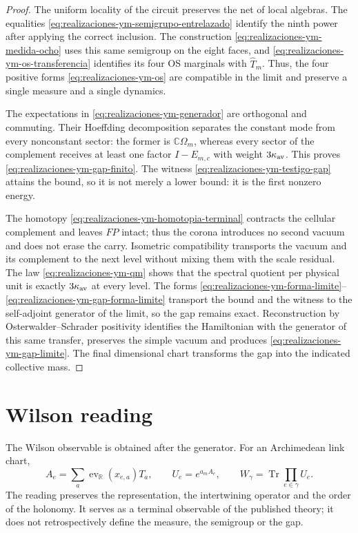 \begin{proof}
The uniform locality of the circuit preserves the net of local algebras. The
equalities \eqref{eq:realizaciones-ym-semigrupo-entrelazado} identify the
ninth power after applying the correct inclusion. The construction
\eqref{eq:realizaciones-ym-medida-ocho} uses this same semigroup on the eight
faces, and \eqref{eq:realizaciones-ym-os-transferencia} identifies its four
OS marginals with \(\widehat T_m\). Thus, the four positive forms
\eqref{eq:realizaciones-ym-os} are compatible in the limit and preserve a
single measure and a single dynamics.

The expectations in \eqref{eq:realizaciones-ym-generador} are orthogonal and
commuting. Their Hoeffding decomposition separates the constant mode from every
nonconstant sector: the former is \(\mathbb C\Omega_m\), whereas every
sector of the complement receives at least one factor \(I-E_{m,c}\) with weight
\(3\kappa_{\rm av}\). This proves
\eqref{eq:realizaciones-ym-gap-finito}. The witness
\eqref{eq:realizaciones-ym-testigo-gap} attains the bound, so it is not
merely a lower bound: it is the first nonzero energy.

The homotopy \eqref{eq:realizaciones-ym-homotopia-terminal} contracts the
cellular complement and leaves \(FP\) intact; thus the corona introduces no
second vacuum and does not erase the carry. Isometric compatibility transports the
vacuum and its complement to the next level without mixing them with the scale
residual. The law
\eqref{eq:realizaciones-ym-qm} shows that the spectral quotient per physical
unit is exactly \(3\kappa_{\rm av}\) at every level. The forms
\eqref{eq:realizaciones-ym-forma-limite}--
\eqref{eq:realizaciones-ym-gap-forma-limite} transport the bound and the witness
to the self-adjoint generator of the limit, so the gap remains exact.
Reconstruction by Osterwalder--Schrader
positivity identifies the Hamiltonian with the generator of this
same transfer, preserves the simple vacuum and produces
\eqref{eq:realizaciones-ym-gap-limite}. The final dimensional chart transforms
the gap into the indicated collective mass.
\end{proof}



\section*{Wilson reading}

The Wilson observable is obtained after the generator. For an Archimedean link
chart,
\begin{equation}\label{eq:realizaciones-ym-wilson}
 A_e=\sum_a\operatorname{ev}_{\mathbb R}(x_{e,a})T_a,
 \qquad
 U_e=e^{a_mA_e},
 \qquad
 W_\gamma=\operatorname{Tr}\!\prod_{e\in\gamma}U_e.
\end{equation}
The reading preserves the representation, the intertwining operator and the
order of the holonomy. It serves as a terminal observable of the published theory; it does not
retrospectively define the measure, the semigroup or the gap.

